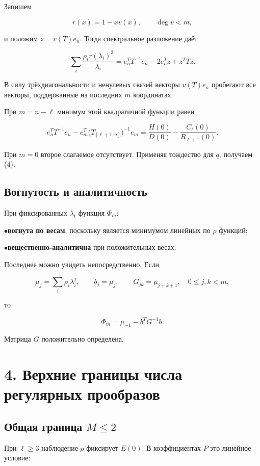 \documentclass[11pt,a4paper]{article}
\begin{document}
Запишем

\[
r(x)=1-xv(x),\qquad \deg v<m,
\]

и положим \(z=v(T)e_n\). Тогда спектральное разложение даёт

\[
\sum_i\frac{\rho_i r(\lambda_i)^2}{\lambda_i}
=
e_n^TT^{-1}e_n-2e_n^Tz+z^TTz.
\]

В силу трёхдиагональности и ненулевых связей векторы \(v(T)e_n\) пробегают все векторы, поддержанные на последних \(m\) координатах.

При \(m=n-\ell\) минимум этой квадратичной функции равен

\[
e_n^TT^{-1}e_n
-
e_m^T\bigl(T_{[\ell+1,n]}\bigr)^{-1}e_m
=
\frac{H(0)}{D(0)}
-\frac{C_\ell(0)}{R_{\ell+1}(0)}.
\]

При \(m=0\) второе слагаемое отсутствует. Применяя тождество для \(q\), получаем (4).

\subsection*{Вогнутость и аналитичность}

При фиксированных \(\lambda_i\) функция \(\Phi_m\):

\par\noindent\(\bullet\)\enspace \textbf{вогнута по весам}, поскольку является минимумом линейных по \(\rho\) функций;
\par\noindent\(\bullet\)\enspace \textbf{вещественно-аналитична} при положительных весах.

Последнее можно увидеть непосредственно. Если

\[
\mu_j=\sum_i\rho_i\lambda_i^j,\qquad
b_j=\mu_j,\qquad G_{jk}=\mu_{j+k+1},
\quad 0\le j,k<m,
\]

то

\[
\Phi_m=\mu_{-1}-b^TG^{-1}b.
\tag{5}
\]

Матрица \(G\) положительно определена.

\section*{\color{ink} 4. Верхние границы числа регулярных прообразов}

\subsection*{Общая граница \(M\le2\)}

При \(\ell\ge3\) наблюдение \(p\) фиксирует \(E(0)\). В коэффициентах \(P\) это линейное условие:
\end{document}
